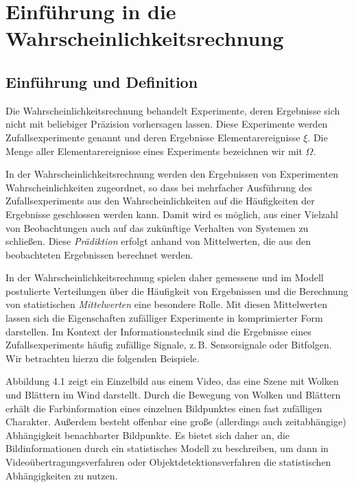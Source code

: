 \chapter{Einführung in die Wahrscheinlichkeitsrechnung}
\label{chap:wahrscheinlichkeit}

\section{Einführung und Definition}
\label{sec:wahrscheinlichkeit-einfuehrung}

Die Wahrscheinlichkeitsrechnung behandelt Experimente, deren Ergebnisse sich nicht mit beliebiger Präzision vorhersagen lassen. Diese Experimente werden Zufallsexperimente genannt und deren Ergebnisse Elementarereignisse $\xi$. Die Menge aller Elementarereignisse eines Experiments bezeichnen wir mit $\Omega$.

In der Wahrscheinlichkeitsrechnung werden den Ergebnissen von Experimenten Wahrscheinlichkeiten zugeordnet, so dass bei mehrfacher Ausführung des Zufallsexperiments aus den Wahrscheinlichkeiten auf die Häufigkeiten der Ergebnisse geschlossen werden kann. Damit wird es möglich, aus einer Vielzahl von Beobachtungen auch auf das zukünftige Verhalten von Systemen zu schließen. Diese \textit{Prädiktion} erfolgt anhand von Mittelwerten, die aus den beobachteten Ergebnissen berechnet werden.

In der Wahrscheinlichkeitsrechnung spielen daher gemessene und im Modell postulierte Verteilungen über die Häufigkeit von Ergebnissen und die Berechnung von statistischen \textit{Mittelwerten} eine besondere Rolle. Mit diesen Mittelwerten lassen sich die Eigenschaften zufälliger Experimente in komprimierter Form darstellen. Im Kontext der Informationstechnik sind die Ergebnisse eines Zufallsexperiments häufig zufällige Signale, z.\,B. Sensorsignale oder Bitfolgen. Wir betrachten hierzu die folgenden Beispiele.

\begin{beispiel}
Abbildung 4.1 zeigt ein Einzelbild aus einem Video, das eine Szene mit Wolken und Blättern im Wind darstellt. Durch die Bewegung von Wolken und Blättern erhält die Farbinformation eines einzelnen Bildpunktes einen fast zufälligen Charakter. Außerdem besteht offenbar eine große (allerdings auch zeitabhängige) Abhängigkeit benachbarter Bildpunkte. Es bietet sich daher an, die Bildinformationen durch ein statistisches Modell zu beschreiben, um dann in Videoübertragungsverfahren oder Objektdetektionsverfahren die statistischen Abhängigkeiten zu nutzen.

\end{beispiel}

